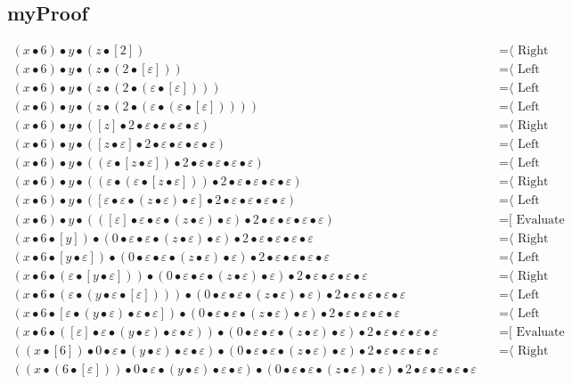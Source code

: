 \documentclass{article}
\begin{document}
\subsection{myProof}
\begin{align*}
(x • 6) • y • (z • [2])
  & \quad \text{=⟨ Right neutrality ]}\\
(x • 6) • y • (z • (2 • [ε]))
  & \quad \text{=⟨ Left neutrality ]}\\
(x • 6) • y • (z • (2 • (ε • [ε])))
  & \quad \text{=⟨ Left neutrality ]}\\
(x • 6) • y • (z • (2 • (ε • (ε • [ε]))))
  & \quad \text{=⟨ Left neutrality ]}\\
(x • 6) • y • ([z] • 2 • ε • ε • ε • ε)
  & \quad \text{=⟨ Right neutrality ]}\\
(x • 6) • y • ([z • ε] • 2 • ε • ε • ε • ε)
  & \quad \text{=⟨ Left neutrality ]}\\
(x • 6) • y • ((ε • [z • ε]) • 2 • ε • ε • ε • ε)
  & \quad \text{=⟨ Left neutrality ]}\\
(x • 6) • y • ((ε • (ε • [z • ε])) • 2 • ε • ε • ε • ε)
  & \quad \text{=⟨ Right neutrality ]}\\
(x • 6) • y • ([ε • ε • (z • ε) • ε] • 2 • ε • ε • ε • ε)
  & \quad \text{=⟨ Left neutrality ]}\\
(x • 6) • y • (([ε] • ε • ε • (z • ε) • ε) • 2 • ε • ε • ε • ε)
  & \quad \text{=[ Evaluate ⟩}\\
(x • 6 • [y]) • (0 • ε • ε • (z • ε) • ε) • 2 • ε • ε • ε • ε
  & \quad \text{=⟨ Right neutrality ]}\\
(x • 6 • [y • ε]) • (0 • ε • ε • (z • ε) • ε) • 2 • ε • ε • ε • ε
  & \quad \text{=⟨ Left neutrality ]}\\
(x • 6 • (ε • [y • ε])) • (0 • ε • ε • (z • ε) • ε) • 2 • ε • ε • ε • ε
  & \quad \text{=⟨ Right neutrality ]}\\
(x • 6 • (ε • (y • ε • [ε]))) • (0 • ε • ε • (z • ε) • ε) • 2 • ε • ε • ε • ε
  & \quad \text{=⟨ Left neutrality ]}\\
(x • 6 • [ε • (y • ε) • ε • ε]) • (0 • ε • ε • (z • ε) • ε) • 2 • ε • ε • ε • ε
  & \quad \text{=⟨ Left neutrality ]}\\
(x • 6 • ([ε] • ε • (y • ε) • ε • ε)) • (0 • ε • ε • (z • ε) • ε) • 2 • ε • ε • ε • ε
  & \quad \text{=[ Evaluate ⟩}\\
((x • [6]) • 0 • ε • (y • ε) • ε • ε) • (0 • ε • ε • (z • ε) • ε) • 2 • ε • ε • ε • ε
  & \quad \text{=⟨ Right neutrality ]}\\
((x • (6 • [ε])) • 0 • ε • (y • ε) • ε • ε) • (0 • ε • ε • (z • ε) • ε) • 2 • ε • ε • ε • ε

\end{align*}
\end{document}
